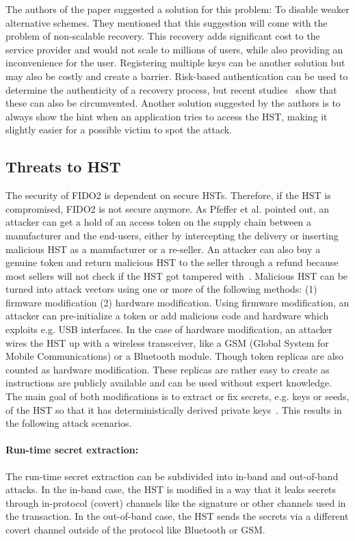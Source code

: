 \documentclass[runningheads]{llncs}
\begin{document}
The authors of the paper suggested a solution for this problem: To disable weaker alternative schemes. They mentioned that this suggestion will come with the problem of non-scalable recovery. This recovery adds significant cost to the service provider and would not scale to millions of users, while also providing an inconvenience for the user. Registering multiple keys can be another solution but may also be costly and create a barrier. Risk-based authentication can be used to determine the authenticity of a recovery process, but recent studies~\cite{10.1145/3372297.3417892} show that these can also be circumvented. Another solution suggested by the authors is to always show the hint when an application tries to access the HST, making it slightly easier for a possible victim to spot the attack.

\subsection{Threats to HST}
The security of FIDO2 is dependent on secure HSTs. Therefore, if the HST is compromised, FIDO2 is not secure anymore. As Pfeffer et al. pointed out, an attacker can get a hold of an access token on the supply chain between a manufacturer and the end-users, either by intercepting the delivery or inserting malicious HST as a manufacturer or a re-seller. An attacker can also buy a genuine token and return malicious HST to the seller through a refund because most sellers will not check if the HST got tampered with~\cite{000007}. Malicious HST can be turned into attack vectors using one or more of the following methods: (1) firmware modification (2) hardware modification. Using firmware modification, an attacker can pre-initialize a token or add malicious code and hardware which exploits e.g. USB interfaces. In the case of hardware modification, an attacker wires the HST up with a wireless transceiver, like a GSM (Global System for Mobile Communications) or a Bluetooth module. Though token replicas are also counted as hardware modification. These replicas are rather easy to create as instructions are publicly available and can be used without expert knowledge. The main goal of both modifications is to extract or fix secrets, e.g. keys or seeds, of the HST so that it has deterministically derived private keys~\cite{272198}. This results in the following attack scenarios.

\paragraph{Run-time secret extraction:}
The run-time secret extraction can be subdivided into in-band and out-of-band attacks. In the in-band case, the HST is modified in a way that it leaks secrets through in-protocol (covert) channels like the signature or other channels used in the transaction. In the out-of-band case, the HST sends the secrets via a different covert channel outside of the protocol like Bluetooth or GSM.
\end{document}
